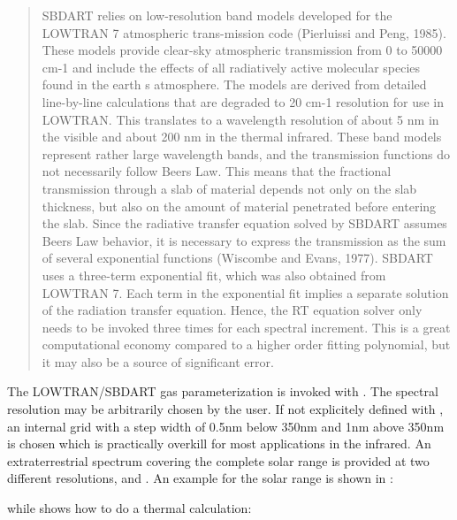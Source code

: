 \begin{quotation} 
  SBDART relies on low-resolution band models
  developed for the LOWTRAN 7 atmospheric trans-mission code (Pierluissi
  and Peng, 1985).
  These models provide clear-sky atmospheric
  transmission from 0 to 50000 cm-1 and include the effects of all
  radiatively active molecular species found in the earth s
  atmosphere. The models are derived from detailed line-by-line
  calculations that are degraded to 20 cm-1 resolution for use in
  LOWTRAN. This translates to a wavelength resolution of about 5 nm in
  the visible and about 200 nm in the thermal infrared. These band
  models represent rather large wavelength bands, and the transmission
  functions do not necessarily follow Beers Law. This means that the
  fractional transmission through a slab of material depends not only on
  the slab thickness, but also on the amount of material penetrated
  before entering the slab. Since the radiative transfer equation solved
  by SBDART assumes Beers Law behavior, it is necessary to express the
  transmission as the sum of several exponential functions (Wiscombe and
  Evans, 1977). SBDART uses a three-term exponential fit, which was also
  obtained from LOWTRAN 7. Each term in the exponential fit implies a
  separate solution of the radiation transfer equation. Hence, the RT
  equation solver only needs to be invoked three times for each spectral
  increment. This is a great computational economy compared to a higher
  order fitting polynomial, but it may also be a source of significant
  error.
\end{quotation}

The LOWTRAN/SBDART gas parameterization is invoked with
. The spectral resolution may be
arbitrarily chosen by the user. If not explicitely defined with
, an internal grid with a step width of
0.5nm below 350nm and 1nm above 350nm is chosen which is practically
overkill for most applications in the infrared. An extraterrestrial
spectrum covering the complete solar range is provided at two
different resolutions,  and
. An example for the solar
range is shown in :


while  shows how to do a
thermal calculation:


